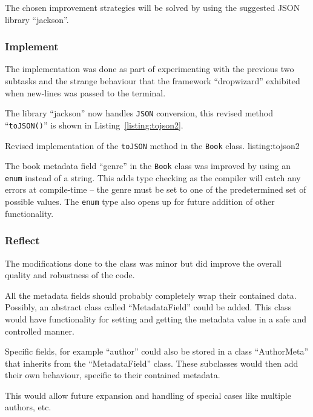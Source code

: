 The chosen improvement strategies will be solved by using the suggested JSON
library ``jackson''\cite{jackson-json}.

\subsubsection{Implement}\label{task-1c-implement}
The implementation was done as part of experimenting with the previous two
subtasks and the strange behaviour that the framework ``dropwizard'' exhibited
when new-lines was passed to the terminal.

The library ``jackson'' now handles \texttt{JSON} conversion,  this revised
method ``\texttt{toJSON()}'' is shown in Listing~\ref{listing:tojson2}.

           {Revised implementation of the \texttt{toJSON\(\)} method in the
            \texttt{Book} class.}
           {listing:tojson2}

The book metadata field ``genre'' in the \texttt{Book} class was improved by
using an \texttt{enum} instead of a string. This adds type checking as the
compiler will catch any errors at compile-time -- the genre must be set to one
of the predetermined set of possible values. The \texttt{enum} type also opens
up for future addition of other functionality.


\subsubsection{Reflect}\label{task-1c-reflect}
The modifications done to the class was minor but did improve the overall
quality and robustness of the code.

All the metadata fields should probably completely wrap their contained data.
Possibly, an abstract class called ``MetadataField'' could be added. This class
would have functionality for setting and getting the metadata value in a safe
and controlled manner.

Specific fields, for example ``author'' could also be stored in a class
``AuthorMeta'' that inherits from the ``MetadataField'' class. These subclasses
would then add their own behaviour, specific to their contained metadata.

This would allow future expansion and handling of special cases like multiple
authors, etc.
